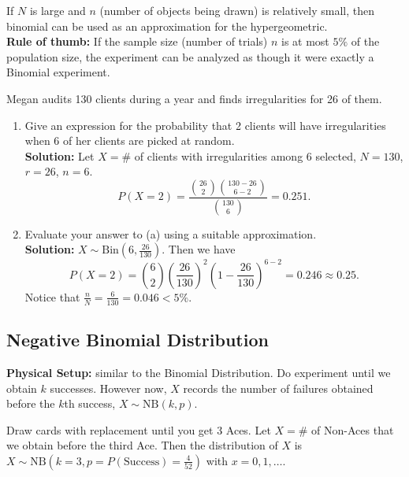 \begin{remark}
    If $N$ is large and $n$ (number of objects being drawn) is relatively small, then binomial can be used as an approximation for the hypergeometric. \\

    \textbf{Rule of thumb:} If the sample size (number of trials) $n$ is at most $5\%$ of the population size, the experiment can be analyzed as though it were exactly a Binomial experiment.
\end{remark}

\begin{example}
    Megan audits 130 clients during a year and finds irregularities for 26 of them.
    \begin{enumerate}[label=(\alph*)]
        \item Give an expression for the probability that 2 clients will have irregularities when 6 of her
        clients are picked at random. \\
        \textbf{Solution:} Let $X = \#$ of clients with irregularities among 6 selected, $N=130$, $r=26$, $n=6$.
        \[P(X=2) = \frac{\binom{26}{2}\binom{130-26}{6-2}}{\binom{130}{6}} = 0.251.\]
        \item Evaluate your answer to (a) using a suitable approximation. \\
        \textbf{Solution:} $X \sim \text{Bin}(6,\frac{26}{130})$. Then we have
        \[P(X=2)=\binom{6}{2}\left(\frac{26}{130}\right)^2 \left(1-\frac{26}{130}\right)^{6-2} = 0.246 \approx 0.25.\]
        Notice that $\frac{n}{N} = \frac{6}{130} = 0.046 < 5\%$.
    \end{enumerate}
\end{example}


\subsection{Negative Binomial Distribution}

\textbf{Physical Setup:} similar to the Binomial Distribution. Do experiment until we obtain $k$ successes. However now, $X$ records the number of
failures obtained before the $k$th success, $X \sim \text{NB}(k,p)$.

\begin{example}
    Draw cards with replacement until you get 3 Aces. Let $X = \#$ of Non-Aces that we obtain before the third Ace. Then the distribution of $X$ is
    $X \sim \text{NB}(k=3, p=P(\text{Success})=\frac{4}{52})$ with $x =  0,1, \ldots$.
\end{example}


